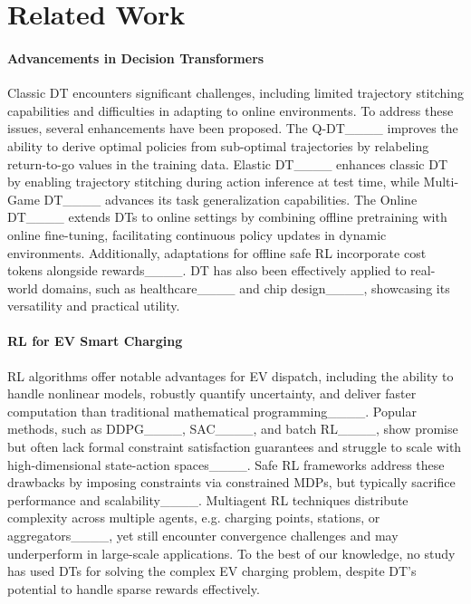 \section{Related Work}
\paragraph{Advancements in Decision Transformers}
Classic DT encounters significant challenges, including limited trajectory stitching capabilities and difficulties in adapting to online environments. To address these issues, several enhancements have been proposed. The Q-DT____ improves the ability to derive optimal policies from sub-optimal trajectories by relabeling return-to-go values in the training data. Elastic DT____ enhances classic DT by enabling trajectory stitching during action inference at test time, while Multi-Game DT____ advances its task generalization capabilities. The Online DT____ extends DTs to online settings by combining offline pretraining with online fine-tuning, facilitating continuous policy updates in dynamic environments. Additionally, adaptations for offline safe RL incorporate cost tokens alongside rewards____. DT has also been effectively applied to real-world domains, such as healthcare____ and chip design____, showcasing its versatility and practical utility.

\paragraph{RL for EV Smart Charging}
RL algorithms offer notable advantages for EV dispatch, including the ability to handle nonlinear models, robustly quantify uncertainty, and deliver faster computation than traditional mathematical programming____. Popular methods, such as DDPG____, SAC____, and batch RL____, show promise but often lack formal constraint satisfaction guarantees and struggle to scale with high-dimensional state-action spaces____. Safe RL frameworks address these drawbacks by imposing constraints via constrained MDPs, but typically sacrifice performance and scalability____. Multiagent RL techniques distribute complexity across multiple agents, e.g. charging points, stations, or aggregators____, yet still encounter convergence challenges and may underperform in large-scale applications. 
To the best of our knowledge, no study has used DTs for solving the complex EV charging problem, despite DT's potential to handle sparse rewards effectively.